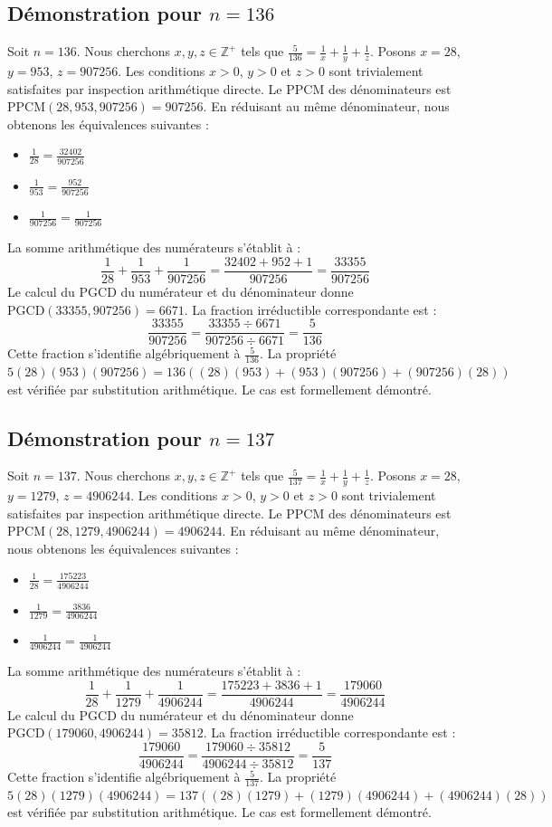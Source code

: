 \documentclass[12pt,a4paper]{article}
\begin{document}
\subsection{Démonstration pour $n = 136$}
Soit $n = 136$. Nous cherchons $x, y, z \in \mathbb{Z}^{+}$ tels que $\frac{5}{136} = \frac{1}{x} + \frac{1}{y} + \frac{1}{z}$.
Posons $x = 28$, $y = 953$, $z = 907256$.
Les conditions $x > 0$, $y > 0$ et $z > 0$ sont trivialement satisfaites par inspection arithmétique directe.
Le PPCM des dénominateurs est $\text{PPCM}(28, 953, 907256) = 907256$.
En réduisant au même dénominateur, nous obtenons les équivalences suivantes :
\begin{itemize}
    \item $\frac{1}{28} = \frac{32402}{907256}$
    \item $\frac{1}{953} = \frac{952}{907256}$
    \item $\frac{1}{907256} = \frac{1}{907256}$
\end{itemize}
La somme arithmétique des numérateurs s'établit à :
$$ \frac{1}{28} + \frac{1}{953} + \frac{1}{907256} = \frac{32402 + 952 + 1}{907256} = \frac{33355}{907256} $$
Le calcul du PGCD du numérateur et du dénominateur donne $\text{PGCD}(33355, 907256) = 6671$.
La fraction irréductible correspondante est :
$$ \frac{33355}{907256} = \frac{33355 \div 6671}{907256 \div 6671} = \frac{5}{136} $$
Cette fraction s'identifie algébriquement à $\frac{5}{136}$.
La propriété $5(28)(953)(907256) = 136((28)(953) + (953)(907256) + (907256)(28))$ est vérifiée par substitution arithmétique.
Le cas est formellement démontré.

\subsection{Démonstration pour $n = 137$}
Soit $n = 137$. Nous cherchons $x, y, z \in \mathbb{Z}^{+}$ tels que $\frac{5}{137} = \frac{1}{x} + \frac{1}{y} + \frac{1}{z}$.
Posons $x = 28$, $y = 1279$, $z = 4906244$.
Les conditions $x > 0$, $y > 0$ et $z > 0$ sont trivialement satisfaites par inspection arithmétique directe.
Le PPCM des dénominateurs est $\text{PPCM}(28, 1279, 4906244) = 4906244$.
En réduisant au même dénominateur, nous obtenons les équivalences suivantes :
\begin{itemize}
    \item $\frac{1}{28} = \frac{175223}{4906244}$
    \item $\frac{1}{1279} = \frac{3836}{4906244}$
    \item $\frac{1}{4906244} = \frac{1}{4906244}$
\end{itemize}
La somme arithmétique des numérateurs s'établit à :
$$ \frac{1}{28} + \frac{1}{1279} + \frac{1}{4906244} = \frac{175223 + 3836 + 1}{4906244} = \frac{179060}{4906244} $$
Le calcul du PGCD du numérateur et du dénominateur donne $\text{PGCD}(179060, 4906244) = 35812$.
La fraction irréductible correspondante est :
$$ \frac{179060}{4906244} = \frac{179060 \div 35812}{4906244 \div 35812} = \frac{5}{137} $$
Cette fraction s'identifie algébriquement à $\frac{5}{137}$.
La propriété $5(28)(1279)(4906244) = 137((28)(1279) + (1279)(4906244) + (4906244)(28))$ est vérifiée par substitution arithmétique.
Le cas est formellement démontré.
\end{document}
